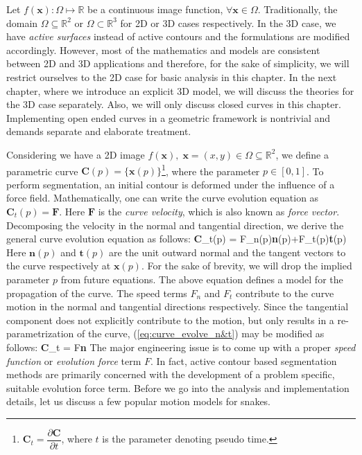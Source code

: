 Let $f(\textbf{x}):\Omega\mapsto\mathbb{R}$ be a continuous image function, $\forall\textbf{x}\in\Omega$. Traditionally, the domain $\Omega\subseteq\mathbb{R}^2$ or  $\Omega\subset\mathbb{R}^3$ for 2D or 3D cases respectively. In the 3D case, we have \textit{active surfaces} instead of active contours and the formulations are modified accordingly. However, most of the mathematics and models are consistent between 2D and 3D applications and therefore, for the sake of simplicity, we will restrict ourselves to the 2D case for basic analysis in this chapter. In the next chapter, where we introduce an explicit 3D model, we will discuss the theories for the 3D case separately. Also, we will only discuss closed curves in this chapter. Implementing open ended curves in a geometric framework is nontrivial and demands separate and elaborate treatment.

Considering we have a 2D image $f(\textbf{x}),\;\textbf{x}=(x,y)\in\Omega\subseteq\mathbb{R}^2$, we define a parametric curve $\textbf{C}(p)=\{\textbf{x}(p)\}$\footnote{$\textbf{C}_t = \dfrac{\partial \textbf{C}}{\partial t}$, where $t$ is the parameter denoting pseudo time.}, where the parameter $p\in\left[0,1\right]$. To perform segmentation, an initial contour is deformed under the influence of a force field. Mathematically, one can write the curve evolution equation as $\textbf{C}_t(p)=\textbf{F}$. Here $\textbf{F}$ is the \textit{curve velocity}, which is also known as \textit{force vector}. Decomposing the velocity in the normal and tangential direction, we derive the general curve evolution equation as follows:
\bea
\textbf{C}_t(p) = F_n(p)\textbf{n}(p)+F_t(p)\textbf{t}(p)
\label{eq:curve_evolve_n&t}
\eea
Here $\textbf{n}(p)$ and $\textbf{t}(p)$ are the unit outward normal and the tangent vectors to the curve respectively at $\textbf{x}(p)$. For the sake of brevity, we will drop the implied parameter $p$ from  future equations. The above equation defines a model for the propagation of the curve. The speed terms $F_n$ and $F_t$ contribute to the curve motion in the normal and tangential directions respectively. Since the tangential component does not explicitly contribute to the motion, but only results in a re-parametrization of the curve, (\ref{eq:curve_evolve_n&t}) may be modified as follows:
\bea
\textbf{C}_t = F\textbf{n}
\label{eq:curve_evolve_general}
\eea
The major engineering issue is to come up with a proper \textit{speed function} or \textit{evolution force} term $F$. In fact, active contour based segmentation methods are primarily concerned with the development of a problem specific, suitable evolution force term. Before we go into the analysis and implementation details, let us discuss a few popular motion models for snakes.

